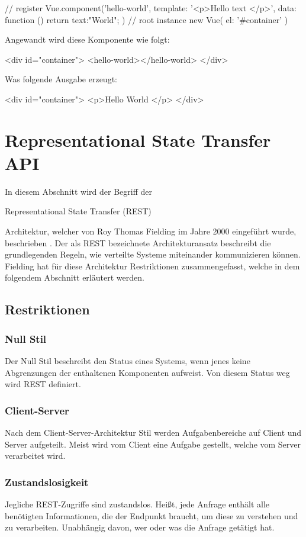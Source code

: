 \begin{JsCode}
	// register
	Vue.component('hello-world', {
		template: '<p>Hello {{ text }} </p>',
		data: function () {
			return {text:"World"};
		}
	})
	// root instance
	new Vue({
		el: '#container'
	})
\end{JsCode}

Angewandt wird diese Komponente wie folgt:
\begin{JsCode}[numbers=none]
	<div id="container">
	<hello-world></hello-world>
	</div>
\end{JsCode}
Was folgende Ausgabe erzeugt:
\begin{JsCode}[numbers=none]
	<div id="container">
	<p>Hello World </p>
	</div>
\end{JsCode}

\section{Representational State Transfer  API}
In diesem Abschnitt wird der Begriff der \begin{english}
Representational State Transfer (REST)
\end{english} Architektur, welcher von Roy Thomas Fielding im Jahre 2000 eingeführt wurde, beschrieben \cite{rest}.
Der als REST bezeichnete Architekturansatz beschreibt die grundlegenden Regeln, wie verteilte Systeme miteinander kommunizieren können.
Fielding hat für diese Architektur Restriktionen zusammengefasst, welche in dem folgendem Abschnitt erläutert werden.
\subsection{Restriktionen}
\subsubsection{Null Stil}
Der Null Stil beschreibt den Status eines Systems, wenn jenes keine Abgrenzungen der enthaltenen Komponenten aufweist. Von diesem Status weg wird REST definiert. 
\subsubsection{Client-Server}
Nach dem Client-Server-Architektur Stil werden Aufgabenbereiche auf Client und Server aufgeteilt. Meist wird vom Client eine Aufgabe gestellt, welche vom Server verarbeitet wird. 
\subsubsection{Zustandslosigkeit}
Jegliche REST-Zugriffe sind zustandslos. Heißt, jede Anfrage enthält alle benötigten Informationen, die der Endpunkt braucht, um diese zu verstehen und zu verarbeiten. Unabhängig davon, wer oder was die Anfrage getätigt hat.  
